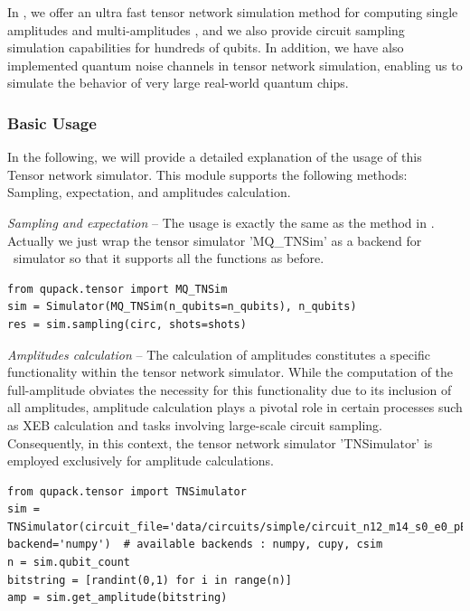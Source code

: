 In \QuPack, we offer an ultra fast tensor network simulation method for computing single amplitudes and multi-amplitudes \cite{kalachev2022multitensor}, and we also provide circuit sampling simulation capabilities for hundreds of qubits. In addition, we have also implemented quantum noise channels in tensor network simulation, enabling us to simulate the behavior of very large real-world quantum chips.

\subsubsection{Basic Usage}
In the following, we will provide a detailed explanation of the usage of this Tensor network simulator.
This module supports the following methods: Sampling,  expectation, and amplitudes calculation.

\textit{Sampling and expectation} -- The usage is exactly the same as the method in \MindQuantum. Actually we just wrap the tensor simulator 'MQ\_TNSim' as a backend for \MindQuantum \  simulator so that it supports all the functions as before.
\begin{lstlisting}
from qupack.tensor import MQ_TNSim
sim = Simulator(MQ_TNSim(n_qubits=n_qubits), n_qubits)
res = sim.sampling(circ, shots=shots)
\end{lstlisting}

\textit{Amplitudes calculation} -- The calculation of amplitudes constitutes a specific functionality within the tensor network simulator. While the computation of the full-amplitude obviates the necessity for this functionality due to its inclusion of all amplitudes, amplitude calculation plays a pivotal role in certain processes such as XEB calculation and tasks involving large-scale circuit sampling. Consequently, in this context, the tensor network simulator 'TNSimulator' is employed exclusively for amplitude calculations.

\begin{lstlisting}
from qupack.tensor import TNSimulator
sim = TNSimulator(circuit_file='data/circuits/simple/circuit_n12_m14_s0_e0_pEFGH.qsim', backend='numpy')  # available backends : numpy, cupy, csim
n = sim.qubit_count
bitstring = [randint(0,1) for i in range(n)]
amp = sim.get_amplitude(bitstring)
\end{lstlisting}

